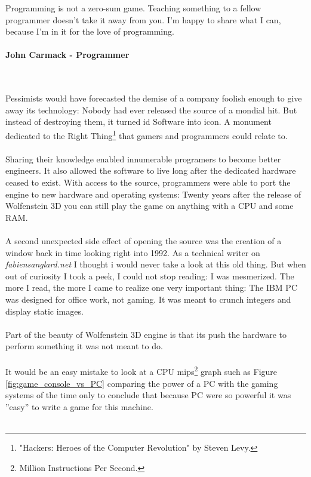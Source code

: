  \begin{fancyquotes}
   Programming is not a zero-sum game. Teaching something to a fellow programmer doesn't take it away from you. I'm happy to share what I can, because I'm in it for the love of programming.\\
   \\
\textbf{John Carmack - Programmer}
 \end{fancyquotes}\\
\\
Pessimists would have forecasted the demise of a company foolish enough to give away its technology: Nobody had ever released the source of a mondial hit. But instead of destroying them, it turned id Software into icon. A monument dedicated to the Right Thing\footnote{"Hackers: Heroes of the Computer Revolution" by Steven Levy.} that gamers and programmers could relate to.\\
\\
Sharing their knowledge enabled innumerable programers to become better engineers. It also allowed the software to live long after the dedicated hardware ceased to exist. With access to the source, programmers were able to port the engine to new hardware and operating systems: Twenty years after the release of Wolfenstein 3D you can still play the game on anything with a CPU and some RAM. \\
\\
A second unexpected side effect of opening the source was the creation of a window back in time looking right into 1992. As a technical writer on \emph{fabiensanglard.net} I thought i would never take a look at this old thing. But when out of curiosity I took a peek, I could not stop reading: I was mesmerized. The more I read, the more I came to realize one very important thing: The IBM PC was designed for office work, not gaming. It was meant to crunch integers and display static images.\\
\\ 
Part of the beauty of Wolfenstein 3D engine is that its push the hardware to perform something it was not meant to do.\\
\\
It would be an easy mistake to look at a CPU mips\footnote{Million Instructions Per Second.} graph such as Figure \ref{fig:game_console_vs_PC} comparing the power of a PC with the gaming systems of the time only to conclude that because PC were so powerful it was ''easy'' to write a game for this machine. \\
\\
